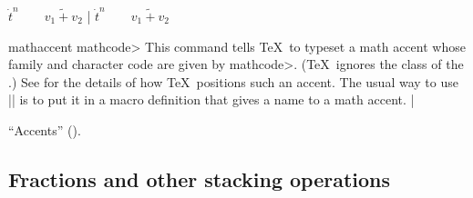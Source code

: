 \example
$\dot t^n \qquad \widetilde{v_1 + v_2}$
|
\produces
$\dot t^n \qquad \widetilde{v_1 + v_2}$
\endexample

\begindesc
\cts mathaccent {\<mathcode>}
\explain
This command tells \TeX\ to typeset a math accent
whose family and character code are given by \<mathcode>.  (\TeX\ ignores
the class of the .)
See  for the details of how \TeX\ positions such an accent.
The usual way to use |\mathaccent| is to put it in a macro definition
that gives a name to a math accent.
\example
\def\acute{\mathaccent "7013}
|
\endexample
\enddesc

\see ``Accents'' ().
\enddesc

\subsection {Fractions and other stacking operations}

